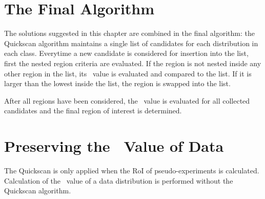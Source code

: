 \section{The Final Algorithm}
The solutions suggested in this chapter are combined in the final algorithm: the Quickscan algorithm maintains a single list of \paramregions candidates for each distribution in each class. Everytime a new candidate is considered for insertion into the list, first the nested region criteria are evaluated. If the region is not nested inside any other region in the list, its \mychi~value is evaluated and compared to the list. If it is larger than the lowest \mychi inside the list, the region is swapped into the list.

After all regions have been considered, the \p~value is evaluated for all collected candidates and the final region of interest is determined. 

\section{Preserving the \p~Value of Data}
The Quickscan is only applied when the RoI of pseudo-experiments is calculated. Calculation of the \p~value of a data distribution is performed without the Quickscan algorithm.



